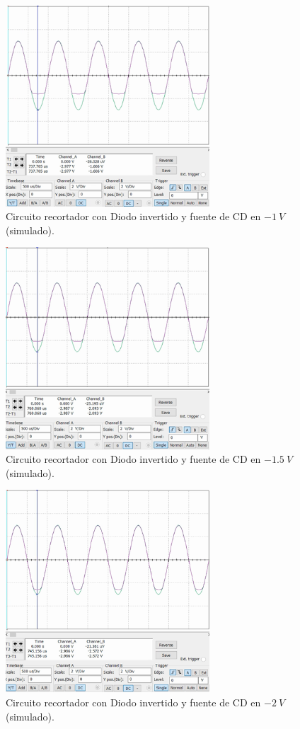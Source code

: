 \documentclass[journal]{IEEEtran}
\begin{document}
\begin{figure}[H]
        \centering
        \includegraphics[width=3in]{SignalSimulated_17.png}
        \caption{Circuito recortador con Diodo invertido y fuente de CD en $-1~V$ (simulado).}
        \label{fig:SignalSimulated_17}
\end{figure}
\begin{figure}[H]
        \centering
        \includegraphics[width=3in]{SignalSimulated_18.png}
        \caption{Circuito recortador con Diodo invertido y fuente de CD en $-1.5~V$ (simulado).}
        \label{fig:SignalSimulated_18}
\end{figure}
\begin{figure}[H]
        \centering
        \includegraphics[width=3in]{SignalSimulated_19.png}
        \caption{Circuito recortador con Diodo invertido y fuente de CD en $-2~V$ (simulado).}
        \label{fig:SignalSimulated_19}
\end{figure}
\end{document}
